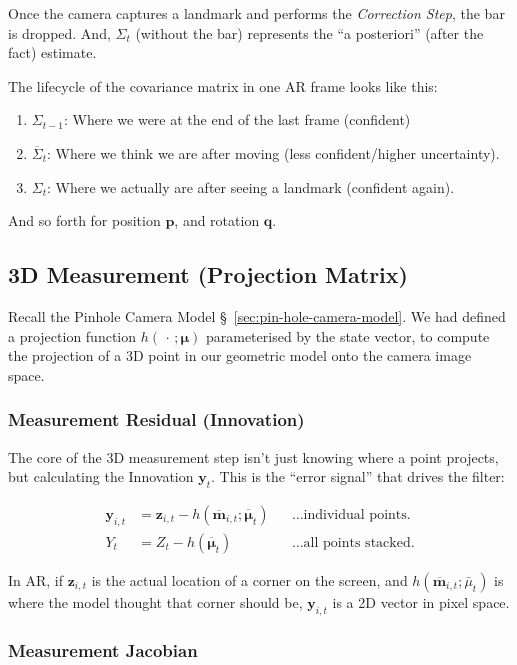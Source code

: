 \documentclass[11pt]{article}
\begin{document}
Once the camera captures a landmark and performs the
\emph{Correction Step}, the bar is dropped.  And, \(\Sigma_t\)
(without the bar) represents the ``a posteriori'' (after
the fact) estimate.

The lifecycle of the covariance matrix in one AR frame
looks like this:
\begin{enumerate}
\item \(\Sigma_{t-1}\): Where we were at the end of the last
frame (confident)
\item \(\overline{\Sigma}_{t}\): Where we think we are after
moving (less confident/higher uncertainty).
\item \(\Sigma_t\): Where we actually are after seeing a
landmark (confident again).
\end{enumerate}

And so forth for position \(\mathbf{p}\), and rotation
\(\mathbf{q}\).
\subsection{3D Measurement (Projection Matrix)}
\label{sec:org887115d}
Recall the Pinhole Camera Model
\S~\ref{sec:pin-hole-camera-model}.  We had
defined a projection function
\(h(\,\cdot\,;\boldsymbol{\mu})\) parameterised by the
state vector, to compute the projection of a 3D point
in our geometric model onto the camera image space.
\subsubsection{Measurement Residual (Innovation)}
\label{sec:org8639868}
The core of the 3D measurement step isn't just knowing
where a point projects, but calculating the Innovation
\(\mathbf{y}_t\). This is the ``error signal'' that drives
the filter:

\begin{align*}
  \mathbf{y}_{i,t}
  &= \mathbf{z}_{i,t} - h(\overline{\mathbf{m}}_{i,t};
    \overline{\boldsymbol{\mu}}_t)
  && \text{\ldots individual points.} \\
  Y_t
  &= Z_t - h(\overline{\boldsymbol{\mu}}_t)
  && \text{\ldots all points stacked.}
\end{align*}

In AR, if \(\mathbf{z}_{i,t}\) is the actual location of
a corner on the screen, and
\(h(\overline{\mathbf{m}}_{i,t}; \bar{\mu}_t)\) is where
the model thought that corner should be,
\(\mathbf{y}_{i,t}\) is a 2D vector in pixel space.
\subsubsection{Measurement Jacobian}
\label{sec:orgc33671e}
\end{document}
